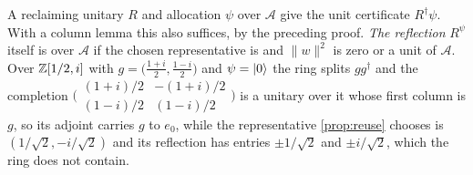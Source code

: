 \documentclass[acmsmall,screen,review,anonymous,nonacm]{acmart}
\begin{document}
A reclaiming unitary $R$ and allocation $\psi$ over $\mathcal A$ give the
unit certificate $R^{\dagger}\psi$. With a column
lemma this also suffices, by the preceding proof. \emph{The reflection} $R^{\psi}$ itself is over
$\mathcal A$ if the chosen representative is and $\lVert w\rVert^{2}$
is zero or a unit of $\mathcal A$. Over $\mathbb{Z}[1/2,i]$ with
$g = \bigl(\tfrac{1+i}{2}, \tfrac{1-i}{2}\bigr)$ and $\psi = \lvert 0 \rangle$ the
ring splits $gg^{\dagger}$ and the completion $\bigl(\begin{smallmatrix}
(1+i)/2 & -(1+i)/2 \\ (1-i)/2 & (1-i)/2\end{smallmatrix}\bigr)$ is a unitary
over it whose first column is $g$, so its adjoint carries $g$ to $e_0$,
while the representative \cref{prop:reuse}
chooses is $(1/\sqrt2, -i/\sqrt2)$ and its reflection has entries
$\pm 1/\sqrt2$ and $\pm i/\sqrt2$, which the ring does not contain.
\end{document}

